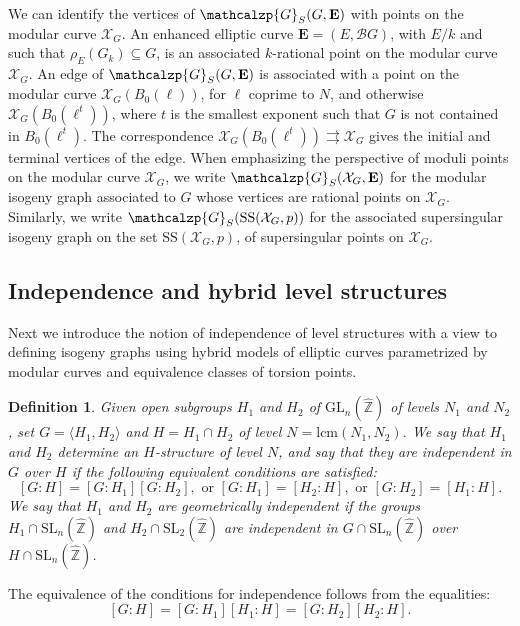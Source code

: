 \documentclass{amsart}
\newcommand{\cB}{\mathcal{B}}
\newcommand{\EE}{\mathbf{E}}
\newcommand{\ZZ}{\mathbb{Z}}
\newcommand{\ZZhat}{\widehat{\ZZ}}
\newcommand{\XC}{\mathcal{X}}
\newcommand{\GL}{\mathrm{GL}}
\newcommand{\SL}{\mathrm{SL}}
\renewcommand{\SS}{\mathrm{SS}}
\newcommand{\Graph}{\mathcalzp{G}}
\newcommand{\Group}{G}
\renewcommand{\SS}{\mathrm{SS}}
\newtheorem{definition}[theorem]{Definition}
\begin{document}
We can identify the vertices of $\Graph_S(\Group,\EE)$ with points on the modular curve $\XC_\Group$.
An enhanced elliptic curve $\EE = (E,\cB\Group)$, with $E/k$ and such that $\rho_{E}(\Group_k)
\subseteq G$, is an associated $k$-rational point on the modular curve~$\XC_G$.
An edge of $\Graph_S(\Group,\EE)$ is associated with a point on the modular curve $\XC_G(B_0(\ell))$,
for $\ell$ coprime to $N$, 
and otherwise $\XC_G(B_0(\ell^t))$, where $t$ is the smallest exponent such that $G$
is not contained in $B_0(\ell^t)$.
The correspondence $\XC_G(B_0(\ell^t)) \rightrightarrows \XC_G$ gives the initial
and terminal vertices of the edge.
When emphasizing the perspective of moduli points on the modular curve $\XC_G$, we
write $\Graph_S(\XC_G,\EE)$ for the modular isogeny graph associated to $G$ whose
vertices are rational points on $\XC_G$.
Similarly, we write $\Graph_S(\SS(\XC_\Group,p))$ for the associated supersingular isogeny
graph on the set $\SS(\XC_\Group,p)$, of supersingular points on $\XC_G$.

\subsection*{Independence and hybrid level structures}
Next we introduce the notion of independence of level structures with a view to defining
isogeny graphs using hybrid models of elliptic curves parametrized by modular curves and
equivalence classes of torsion points.

\begin{definition}
Given open subgroups $H_1$ and $H_2$ of $\GL_n(\ZZhat)$ of levels $N_1$
and $N_2$, set $G = \langle{H_1,H_2}\rangle$ and $H = H_1 \cap H_2$
of level $N = \mathrm{lcm}(N_1,N_2)$. We say that $H_1$ and $H_2$ determine
an $H$-structure of level $N$, and say that they are {\it independent} in $G$
over $H$ if the following equivalent conditions are satisfied:
$$
[G:H] = [G:H_1][G:H_2], \mbox{ or }
[G:H_1] = [H_2:H], \mbox{ or }
[G:H_2] = [H_1:H].
$$
We say that $H_1$ and $H_2$ are geometrically independent if the groups
$H_1 \cap \SL_n(\ZZhat)$ and $H_2 \cap \SL_2(\ZZhat)$ are independent in
$G \cap \SL_n(\ZZhat)$ over $H \cap \SL_n(\ZZhat)$.
\end{definition}

The equivalence of the conditions for independence follows from the equalities:
$$
[G:H] = [G:H_1][H_1:H] = [G:H_2][H_2:H].
$$
\end{document}
